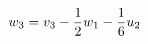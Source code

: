 \documentclass[preview]{standalone}
\begin{document}
\begin{align*}
\special{dvisvgm:raw <g id='unique000'>}w_3=v_3-\frac12w_1-\frac16u_2\special{dvisvgm:raw </g>}
\end{align*}
\end{document}
